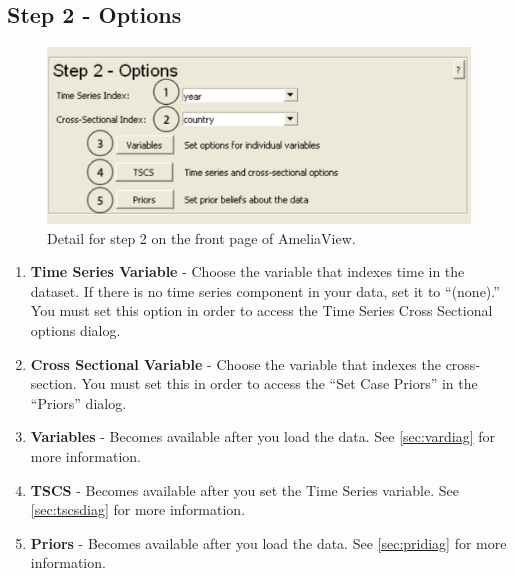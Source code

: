 \documentclass[12pt,titlepage]{article}
\begin{document}
\subsection{Step 2 - Options}
\label{sec:step2}
\begin{figure}[ht]
  \centering
  \includegraphics[scale=.75]{step2}
  \caption{Detail for step 2 on the front page of AmeliaView.}
\end{figure}
\begin{enumerate}
\item \textbf{Time Series Variable} - Choose the variable that indexes time in the dataset.  If there is no time series component in your data, set it to ``(none).''  You must set this option in order to access the Time Series Cross Sectional options dialog.  
\item \textbf{Cross Sectional Variable} - Choose the variable that indexes the cross-section.  You must set this in order to access the ``Set Case Priors'' in the ``Priors'' dialog.  
\item \textbf{Variables} - Becomes available after you load the data.  See \ref{sec:vardiag} for more information.
\item \textbf{TSCS} - Becomes available after you set the Time Series variable.  See \ref{sec:tscsdiag} for more information.
\item \textbf{Priors} - Becomes available after you load the data.  See \ref{sec:pridiag} for more information.
\end{enumerate}
\end{document}

